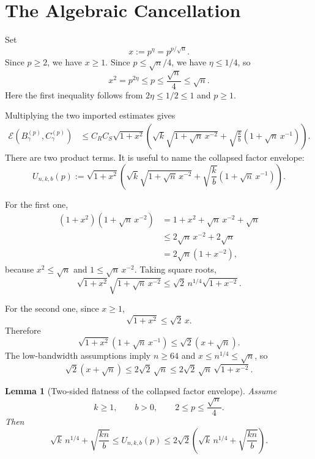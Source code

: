 \documentclass[11pt]{article}
\newtheorem{lemma}[theorem]{Lemma}
\newcommand{\Eerr}{\mathcal E}
\begin{document}
\section{The Algebraic Cancellation}

Set
\[
    x := p^\eta = p^{p/\sqrt n}.
\]
Since \(p\ge2\), we have \(x\ge1\).
Since \(p\le\sqrt n/4\), we have \(\eta\le1/4\), so
\[
    x^2=p^{2\eta}\le p\le \frac{\sqrt n}{4}\le\sqrt n.
\]
Here the first inequality follows from \(2\eta\le1/2\le1\) and \(p\ge1\).

Multiplying the two imported estimates gives
\[
\begin{aligned}
    \Eerr(B_\gamma^{(p)},C_\gamma^{(p)})
    &\le
    C_R C_S
    \sqrt{1+x^2}
    \left(
        \sqrt{k}\sqrt{1+\sqrt n\,x^{-2}}
        +
        \sqrt{\frac{k}{b}}
        (1+\sqrt n\,x^{-1})
    \right).
\end{aligned}
\]
There are two product terms.
It is useful to name the collapsed factor envelope:
\[
    U_{n,k,b}(p)
    :=
    \sqrt{1+x^2}
    \left(
        \sqrt{k}\sqrt{1+\sqrt n\,x^{-2}}
        +
        \sqrt{\frac{k}{b}}
        (1+\sqrt n\,x^{-1})
    \right).
\]

For the first one,
\[
\begin{aligned}
    (1+x^2)(1+\sqrt n\,x^{-2})
    &=
    1+x^2+\sqrt n\,x^{-2}+\sqrt n  \\
    &\le
    2\sqrt n\,x^{-2}+2\sqrt n       \\
    &=
    2\sqrt n(1+x^{-2}),
\end{aligned}
\]
because \(x^2\le\sqrt n\) and \(1\le \sqrt n\,x^{-2}\).
Taking square roots,
\[
    \sqrt{1+x^2}\sqrt{1+\sqrt n\,x^{-2}}
    \le
    \sqrt2\, n^{1/4}\sqrt{1+x^{-2}}.
\]

For the second one, since \(x\ge1\),
\[
    \sqrt{1+x^2}\le \sqrt2\,x.
\]
Therefore
\[
    \sqrt{1+x^2}(1+\sqrt n\,x^{-1})
    \le
    \sqrt2(x+\sqrt n).
\]
The low-bandwidth assumptions imply \(n\ge64\) and \(x\le n^{1/4}\le\sqrt n\), so
\[
    \sqrt2(x+\sqrt n)
    \le
    2\sqrt2\,\sqrt n
    \le
    2\sqrt2\,\sqrt n\,\sqrt{1+x^{-2}}.
\]

\begin{lemma}[Two-sided flatness of the collapsed factor envelope]
Assume
\[
    k\ge1,
    \qquad
    b>0,
    \qquad
    2\le p\le\frac{\sqrt n}{4}.
\]
Then
\[
    \sqrt{k}\,n^{1/4}
    +
    \sqrt{\frac{kn}{b}}
    \le
    U_{n,k,b}(p)
    \le
    2\sqrt2
    \left(
        \sqrt{k}\,n^{1/4}
        +
        \sqrt{\frac{kn}{b}}
    \right).
\]
\end{lemma}
\end{document}
